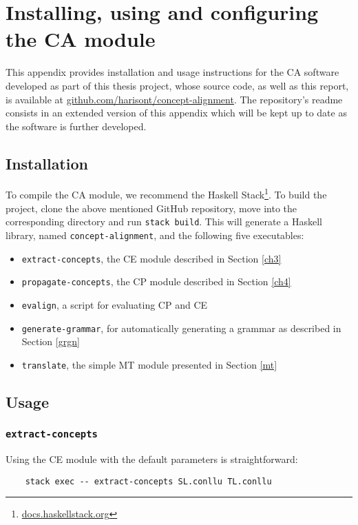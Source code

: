 \chapter{Installing, using and configuring the CA module} \label{b}
This appendix provides installation and usage instructions for the CA software developed as part of this thesis project, whose source code, as well as this report, is available at \url{github.com/harisont/concept-alignment}. The repository's readme consists in an extended version of this appendix which will be kept up to date as the software is further developed.

\section{Installation}
To compile the CA module, we recommend the Haskell Stack\footnote{\url{docs.haskellstack.org}}. 
To build the project, clone the above mentioned GitHub repository, move into the corresponding directory and run \texttt{stack build}. 
This will generate a Haskell library, named \texttt{concept-alignment}, and the following five executables: \smallskip

\begin{itemize}
    \item \texttt{extract-concepts}, the CE module described in Section \ref{ch3}
    \item \texttt{propagate-concepts}, the CP module described in Section \ref{ch4}
    \item \texttt{evalign}, a script for evaluating CP and CE
    \item \texttt{generate-grammar}, for automatically generating a grammar as described in Section \ref{grgn}
    \item \texttt{translate}, the simple MT module presented in Section \ref{mt}
\end{itemize}

\section{Usage}
\subsection{\texttt{extract-concepts}}
Using the CE module with the default parameters is straightforward: \smallskip

\begin{verbatim}
    stack exec -- extract-concepts SL.conllu TL.conllu
\end{verbatim} \smallskip

